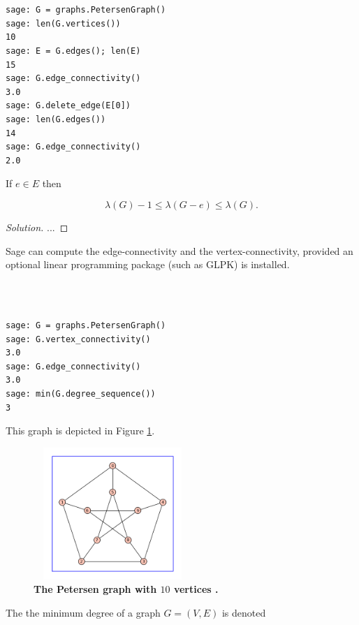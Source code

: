 %
\begin{center}
\fontsize{9pt}{9pt}
\selectfont
\tt
\begin{lstlisting}

sage: G = graphs.PetersenGraph()
sage: len(G.vertices())
10
sage: E = G.edges(); len(E)
15
sage: G.edge_connectivity()
3.0
sage: G.delete_edge(E[0])
sage: len(G.edges())
14
sage: G.edge_connectivity()
2.0

\end{lstlisting}
\end{center}
%

\begin{lemma}
{\rm
If $e\in E$ then

\[
\lambda(G)-1\leq \lambda(G-e)\leq \lambda(G).
\]
}
\end{lemma}

\begin{proof}[Solution]

...

\end{proof}

\begin{example}
{\rm
Sage can compute the edge-connectivity and the vertex-connectivity,
provided an optional linear programming package
(such as GLPK) is installed.

%
\begin{center}
\fontsize{9pt}{9pt}
\selectfont
\tt
\begin{lstlisting}

sage: G = graphs.PetersenGraph()
sage: G.vertex_connectivity() 
3.0 
sage: G.edge_connectivity()
3.0
sage: min(G.degree_sequence())
3

\end{lstlisting}
\end{center}
%
This graph is depicted in Figure \ref{fig:petersen-graph}.


\begin{figure}[h!]
\begin{center}
\includegraphics[height=5cm,width=6cm]{image/petersen-graph}
\end{center}
\caption{{\bf The Petersen graph with $10$ vertices .} }
\label{fig:petersen-graph}
\end{figure}
}
\end{example}
The the minimum degree of a graph $G=(V,E)$ is
denoted

